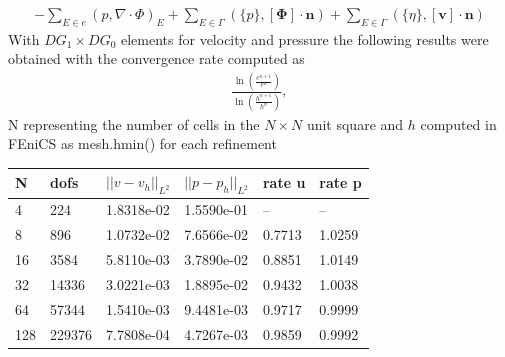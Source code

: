 \begin{align}
	- \sum_{E \in e}(p, \nabla \cdot \Phi)_E + \sum_{E \in \Gamma}(\{p\},[\mathbf{\Phi}]\cdot \mathbf{n}) + \sum_{E \in \Gamma}(\{ \eta \},[\mathbf{v}]\cdot \mathbf{n})
\end{align}
With $DG_1\times DG_0$ elements for velocity and pressure the following results were obtained with the convergence rate computed as 
\begin{align}
\frac{\ln(\frac{e^{n+1}}{e^n})}{\ln(\frac{h^{n+1}}{h^n})},
\end{align}
N representing the number of cells in the $N\times N$ unit square and $h$ computed in FEniCS as mesh.hmin() for each refinement
\begin{table}[!h]
\begin{center}
  \begin{tabular}{|l | l | l | l| l| l|} \hline
	N & dofs & $||v-v_h||_{L^2}$&  $||p-p_h||_{L^2}$ & rate u & rate p\\ \hline
    4 & 224 & 1.8318e-02 & 1.5590e-01 & -- & --\\   \hline
    8 & 896 & 1.0732e-02 & 7.6566e-02 & 0.7713 & 1.0259 \\ \hline
    16 & 3584 & 5.8110e-03 & 3.7890e-02 & 0.8851 & 1.0149 \\ \hline
	32 & 14336 & 3.0221e-03 & 1.8895e-02 & 0.9432 & 1.0038 \\ \hline
	64 & 57344 & 1.5410e-03 & 9.4481e-03 & 0.9717 & 0.9999 \\ \hline
	128 & 229376 & 7.7808e-04 & 4.7267e-03 & 0.9859 & 0.9992 \\ \hline \hline
  \end{tabular}
\end{center}
\end{table}

